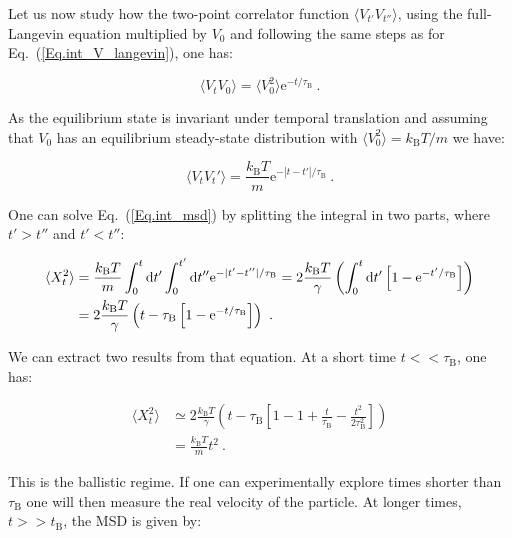 Let us now study how the two-point correlator function $ \langle V_{t'}V_{t''} \rangle $, using the full-Langevin equation multiplied by $V_0$ and following the same steps as for Eq.~(\ref{Eq.int_V_langevin}), one  has:

\begin{equation}
	\langle V_t V_0 \rangle = \langle V_0 ^2 \rangle \mathrm{e}^{-t/\tau_{\mathrm{B}}}~.
\end{equation}

As the equilibrium state is invariant under temporal translation and assuming that $V_0$ has an equilibrium steady-state distribution with $\langle V_0^2 \rangle = k_\mathrm{B} T / m$ we have:

\begin{equation}
	\langle V_t V_t' \rangle = \frac{k_\mathrm{B}T}{m} \mathrm{e}^{-|t-t'|/\tau_{\mathrm{B}}}~.
\end{equation}

One can solve Eq.~(\ref{Eq.int_msd}) by splitting the integral in two parts, where $t'>t''$ and $ t' < t''$:

\begin{equation}
	\begin{aligned}
		\langle X_t ^2 \rangle & =    \frac{k_\mathrm{B}T}{m}  \int _0 ^t \textnormal{d}t' \int _0 ^{t'} \textnormal{d}t'' \mathrm{e} ^ {- |t' - t''| / \tau_\mathrm{B}} = 2 \frac{k_\mathrm{B}T}{\gamma} \left( \int_0 ^t \textnormal{d}t' \left[1 - \mathrm{e}^{-t'/\tau_\mathrm{B}} \right] \right) \\
		& = 2 \frac{k_\mathrm{B} T}{\gamma} \left( t - \tau_\mathrm{B} \left[ 1 - \mathrm{e}^{-t/\tau_\mathrm{B}} \right] \right) ~.
	\end{aligned}
\end{equation}

We can extract two results from that equation. At a short time $t << \tau_\mathrm{B}$, one has:

\begin{equation}
	\begin{aligned}
		\langle X_t ^2 \rangle & \simeq  2 \frac{k_\mathrm{B} T}{\gamma} \left( t - \tau_\mathrm{B} \left[ 1 - 1 + \frac{t}{\tau_\mathrm{B}} - \frac{t^2}{ 2 \tau_\mathrm{B} ^2}\right]         \right) \\
		& = \frac{k_\mathrm{B} T}{m} t^2 ~.
	\end{aligned}
	\label{Eq.shorttimemsd}
\end{equation}

This is the ballistic regime. If one can experimentally explore times shorter than $\tau _ \mathrm{B} $ one will then measure the real velocity of the particle. At longer times, $t >> t_\mathrm{B}$, the \gls{MSD} is given by:

